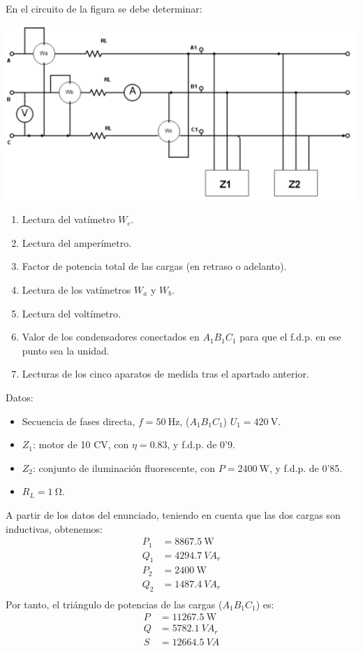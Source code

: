 \documentclass[12pt]{article}
\begin{document}
En el circuito de la figura se debe determinar:

\begin{center}
  \includegraphics[scale=0.4]{../figs/FiguraBT3.pdf}
\end{center}

\begin{enumerate}
\item Lectura del vatímetro $W_c$.
\item Lectura del amperímetro.
\item Factor de potencia total de las cargas (en retraso o
  adelanto).
\item Lectura de los vatímetros $W_a$ y $W_b$.
\item Lectura del voltímetro.
\item Valor de los condensadores conectados en $A_1B_1C_1$ para
  que el f.d.p. en ese punto sea la unidad.
\item Lecturas de los cinco aparatos de medida tras el apartado
  anterior.
\end{enumerate}

Datos:
\begin{itemize}
\item Secuencia de fases directa, $f = \SI{50}{\hertz}$, ($A_1B_1C_1$)
  $U_1 = \SI{420}{\volt}$.
\item $Z_1$: motor de 10 CV, con $\eta = 0.83$, y f.d.p. de 0'9.
\item $Z_2$: conjunto de iluminación fluorescente, con
  $P = \SI{2400}{\watt}$, y f.d.p. de 0'85.
\item $R_L = \SI{1}{\ohm}$.
\end{itemize}

\noindent\hrulefill

A partir de los datos del enunciado, teniendo en cuenta que las dos
cargas son inductivas, obtenemos:
\begin{align*}
  P_1 &= \SI{8867.5}{\watt}\\
  Q_1 &= \SI{4294.7}{VA}_r\\
  P_2 &= \SI{2400}{\watt}\\
  Q_2 &= \SI{1487.4}{VA}_r\\
\end{align*}
Por tanto, el triángulo de potencias de las cargas ($A_1B_1C_1$) es:
\begin{align*}
  P &= \SI{11267.5}{\watt}\\
  Q &= \SI{5782.1}{VA}_r\\
  S &= \SI{12664.5}{VA}\\
\end{align*}
\end{document}
